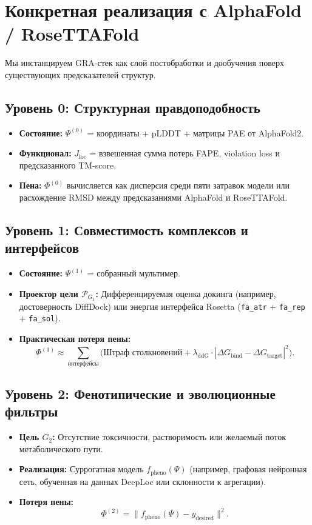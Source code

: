 \documentclass[11pt]{article}
\newcommand{\cP}{\mathcal{P}}
\begin{document}
\section{Конкретная реализация с AlphaFold / RoseTTAFold}

Мы инстанцируем GRA-стек как слой постобработки и дообучения поверх существующих предсказателей структур.

\subsection{Уровень 0: Структурная правдоподобность}
\begin{itemize}
    \item \textbf{Состояние:} \(\Psi^{(0)}\) = координаты + pLDDT + матрицы PAE от AlphaFold2.
    \item \textbf{Функционал:} \(J_{\text{loc}}\) = взвешенная сумма потерь FAPE, violation loss и предсказанного TM-score.
    \item \textbf{Пена:} \(\Phi^{(0)}\) вычисляется как дисперсия среди пяти затравок модели или расхождение RMSD между предсказаниями AlphaFold и RoseTTAFold.
\end{itemize}

\subsection{Уровень 1: Совместимость комплексов и интерфейсов}
\begin{itemize}
    \item \textbf{Состояние:} \(\Psi^{(1)}\) = собранный мультимер.
    \item \textbf{Проектор цели \(\cP_{G_1}\):} Дифференцируемая оценка докинга (например, достоверность DiffDock) или энергия интерфейса Rosetta (\texttt{fa\_atr} + \texttt{fa\_rep} + \texttt{fa\_sol}).
    \item \textbf{Практическая потеря пены:}
    \begin{equation}
    \Phi^{(1)} \approx \sum_{\text{интерфейсы}} \big( \text{Штраф столкновений} + \lambda_{\text{ddG}} \cdot |\Delta G_{\text{bind}} - \Delta G_{\text{target}}|^2 \big).
    \end{equation}
\end{itemize}

\subsection{Уровень 2: Фенотипические и эволюционные фильтры}
\begin{itemize}
    \item \textbf{Цель \(G_2\):} Отсутствие токсичности, растворимость или желаемый поток метаболического пути.
    \item \textbf{Реализация:} Суррогатная модель \(f_{\text{pheno}}(\Psi)\) (например, графовая нейронная сеть, обученная на данных DeepLoc или склонности к агрегации).
    \item \textbf{Потеря пены:}
    \begin{equation}
    \Phi^{(2)} = \| f_{\text{pheno}}(\Psi) - y_{\text{desired}} \|^2.
    \end{equation}
\end{itemize}
\end{document}
